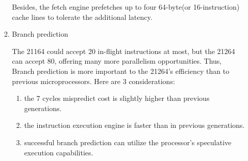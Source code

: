 \documentclass[11pt]{article}
\begin{document}
\begin{itemize}
\begin{enumerate}
		Besides, the fetch engine prefetches up to four 64-byte(or 16-instruction) cache lines to tolerate the additional latency.
		\item Branch prediction
		
		The 21164 could accept 20 in-flight instructions at most, but the 21264 can accept 80, offering many more parallelism opportunities. Thus, Branch prediction is more important to the 21264's efficiency than to previous microprocessors. Here are 3 considerations:
		\begin{enumerate}
			\item the 7 cycles mispredict cost is slightly higher than previous generations.
			\item the instruction execution engine is faster than in previous generations.
			\item successful branch prediction can utilize the processor's speculative execution capabilities. 
		\end{enumerate}
		

\end{enumerate}
\end{itemize}
\end{document}

